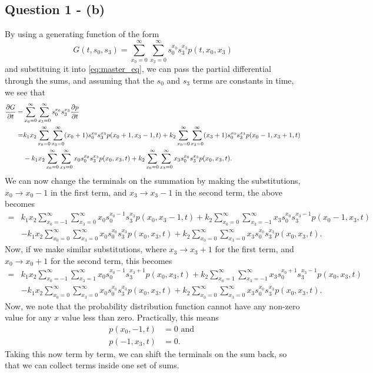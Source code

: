 \documentclass[11pt,a4paper]{article}
\begin{document}
\subsection{Question 1 - (b)}
\label{sec:question1:subsec:partb}
By using a generating function of the form 
\begin{equation}
G(t,s_0,s_3) = \sum_{x_{0}=0}^{\infty} \sum_{x_{3}=0}^{\infty} s_0^{x_0} s_3^{x_3} p(t,x_0,x_3)
\end{equation}
and substituing it into \eqref{eq:master_eq}, we can pass the partial differential through the sums, and assuming that the $s_0$ and $s_3$ terms are constants in time, we see that
\begin{align*}
\pdv{G}{t} = & \sum_{x_0=0}^{\infty} \sum_{x_3=0}^{\infty} s_0^{x_0} s_3^{x_3} \pdv{p}{t} \\
= & k_1 x_2 \sum_{x_0=0}^{\infty} \sum_{x_3=0}^{\infty} (x_0 + 1) s_0^{x_0} s_3^{x_3} p(x_0+1,x_3-1,t) + k_2 \sum_{x_0=0}^{\infty} \sum_{x_3=0}^{\infty} (x_3+1) s_0^{x_0} s_3^{x_3} p(x_0-1,x_3+1,t) \\ 
& - k_1 x_2 \sum_{x_0=0}^{\infty} \sum_{x_3=0}^{\infty} x_0 s_0^{x_0} s_3^{x_3} p(x_0,x_3,t) + k_2 \sum_{x_0=0}^{\infty} \sum_{x_3=0}^{\infty} x_3 s_0^{x_0} s_3^{x_3} p(x_0,x_3,t). 
\end{align*}
We can now change the terminals on the summation by making the substitutions, $x_0 \rightarrow x_0 -1 $ in the first term, and $x_3 \rightarrow x_3 - 1$ in the second term, the above becomes
\begin{align*}
= & k_1 x_2 \sum_{x_0=-1}^{\infty} \sum_{x_3=0}^{\infty} x_0  s_0^{x_0-1} s_3^{x_3} p(x_0,x_3-1,t) + k_2 \sum_{x_0=0}^{\infty} \sum_{x_3=-1}^{\infty} x_3 s_0^{x_0} s_3^{x_3-1} p(x_0-1,x_3,t) \\ 
& - k_1 x_2 \sum_{x_0=0}^{\infty} \sum_{x_3=0}^{\infty} x_0 s_0^{x_0} s_3^{x_3} p(x_0,x_3,t) + k_2 \sum_{x_0=0}^{\infty} \sum_{x_3=0}^{\infty} x_3 s_0^{x_0} s_3^{x_3} p(x_0,x_3,t) .
\end{align*}
Now, if we make similar substitutions, where $x_3 \rightarrow x_3 + 1$ for the first term, and $x_0 \rightarrow x_0 +1 $ for the second term, this becomes 
\begin{align*}
= & k_1 x_2 \sum_{x_0=-1}^{\infty} \sum_{x_3=1}^{\infty} x_0 s_0^{x_0-1} s_3^{x_3+1} p(x_0,x_3,t) + k_2 \sum_{x_0=1}^{\infty} \sum_{x_3=-1}^{\infty} x_3 s_0^{x_0+1} s_3^{x_3-1} p(x_0,x_3,t) \\ 
& - k_1 x_2 \sum_{x_0=0}^{\infty} \sum_{x_3=0}^{\infty} x_0 s_0^{x_0} s_3^{x_3} p(x_0,x_3,t) + k_2 \sum_{x_0=0}^{\infty} \sum_{x_3=0}^{\infty} x_3 s_0^{x_0} s_3^{x_3} p(x_0,x_3,t) .
\end{align*}
Now, we note that the probability distribution function cannot have any non-zero value for any $x$ value less than zero. Practically, this means 
\begin{align*}
p(x_0,-1,t) &= 0 \text{ and }\\
p(-1,x_3,t) &= 0.
\end{align*}
Taking this now term by term, we can shift the terminals on the sum back, so that we can collect terms inside one set of sums. 
\end{document}
